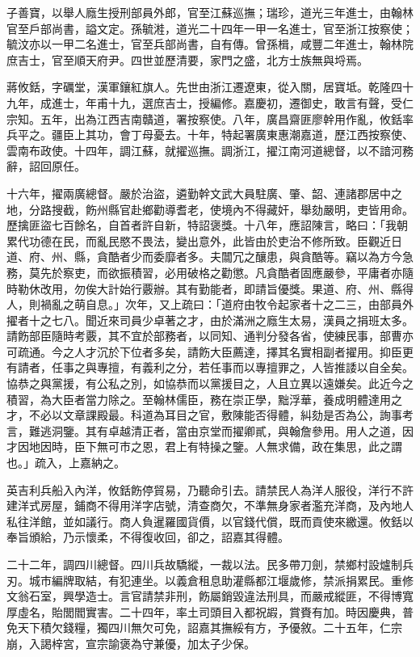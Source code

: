 \begin{pinyinscope}
子善寶，以舉人廕生授刑部員外郎，官至江蘇巡撫；瑞珍，道光三年進士，由翰林官至戶部尚書，謚文定。孫毓溎，道光二十四年一甲一名進士，官至浙江按察使；毓汶亦以一甲二名進士，官至兵部尚書，自有傳。曾孫楫，咸豐二年進士，翰林院庶吉士，官至順天府尹。四世並歷清要，家門之盛，北方士族無與埒焉。

蔣攸銛，字礪堂，漢軍鑲紅旗人。先世由浙江遷遼東，從入關，居寶坻。乾隆四十九年，成進士，年甫十九，選庶吉士，授編修。嘉慶初，遷御史，敢言有聲，受仁宗知。五年，出為江西吉南贛道，署按察使。八年，廣昌齋匪廖幹用作亂，攸銛率兵平之。疆臣上其功，會丁母憂去。十年，特起署廣東惠潮嘉道，歷江西按察使、雲南布政使。十四年，調江蘇，就擢巡撫。調浙江，擢江南河道總督，以不諳河務辭，詔回原任。

十六年，擢兩廣總督。嚴於治盜，遴勤幹文武大員駐廣、肇、韶、連諸郡居中之地，分路搜截，飭州縣官赴鄉勸導耆老，使境內不得藏奸，舉劾嚴明，吏皆用命。歷擒匪盜七百餘名，自首者許自新，特詔褒獎。十八年，應詔陳言，略曰：「我朝累代功德在民，而亂民愍不畏法，變出意外，此皆由於吏治不修所致。臣觀近日道、府、州、縣，貪酷者少而委靡者多。夫闒冗之釀患，與貪酷等。竊以為方今急務，莫先於察吏，而欲振積習，必用破格之勸懲。凡貪酷者固應嚴參，平庸者亦隨時勒休改用，勿俟大計始行覈辦。其有勤能者，即請旨優獎。果道、府、州、縣得人，則禍亂之萌自息。」次年，又上疏曰：「道府由牧令起家者十之二三，由部員外擢者十之七八。聞近來司員少卓著之才，由於滿洲之廕生太易，漢員之捐班太多。請飭部臣隨時考覈，其不宜於部務者，以同知、通判分發各省，使練民事，部曹亦可疏通。今之人才沉於下位者多矣，請飭大臣薦達，擇其名實相副者擢用。抑臣更有請者，任事之與專擅，有義利之分，若任事而以專擅罪之，人皆推諉以自全矣。協恭之與黨援，有公私之別，如協恭而以黨援目之，人且立異以遠嫌矣。此近今之積習，為大臣者當力除之。至翰林儒臣，務在崇正學，黜浮華，養成明體達用之才，不必以文章課殿最。科道為耳目之官，敷陳能否得體，糾劾是否為公，詢事考言，難逃洞鑒。其有卓越清正者，當由京堂而擢卿貳，與翰詹參用。用人之道，因才因地因時，臣下無可市之恩，君上有特操之鑒。人無求備，政在集思，此之謂也。」疏入，上嘉納之。

英吉利兵船入內洋，攸銛飭停貿易，乃聽命引去。請禁民人為洋人服役，洋行不許建洋式房屋，鋪商不得用洋字店號，清查商欠，不準無身家者濫充洋商，及內地人私往洋館，並如議行。商人負暹羅國貨價，以官錢代償，既而貢使來繳還。攸銛以奉旨頒給，乃示懷柔，不得復收回，卻之，詔嘉其得體。

二十二年，調四川總督。四川兵故驕縱，一裁以法。民多帶刀劍，禁鄉村設爐制兵刃。城市編牌取結，有犯連坐。以義倉租息助灌縣都江堰歲修，禁派捐累民。重修文翁石室，興學造士。言官請禁非刑，飭屬銷毀違法刑具，而嚴戒縱匪，不得博寬厚虛名，貽閭閻實害。二十四年，率土司頭目入都祝嘏，賞賚有加。時因慶典，普免天下積欠錢糧，獨四川無欠可免，詔嘉其撫綏有方，予優敘。二十五年，仁宗崩，入謁梓宮，宣宗諭褒為守兼優，加太子少保。


\end{pinyinscope}

